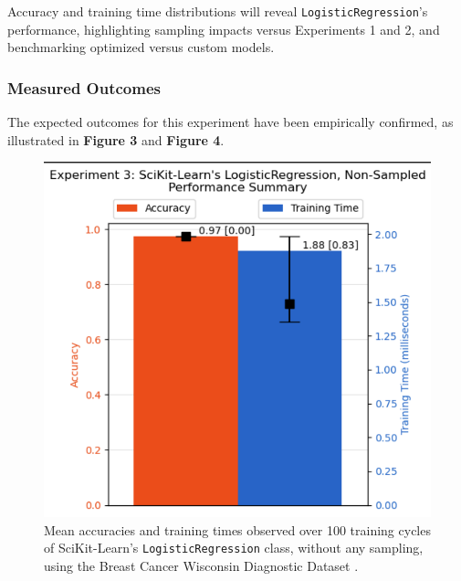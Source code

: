 \documentclass{article}
\theoremstyle{plain}
\theoremstyle{definition}
\theoremstyle{remark}
\begin{document}
Accuracy and training time distributions will reveal \texttt{LogisticRegression}'s performance, highlighting sampling impacts versus Experiments 1 and 2, and benchmarking optimized versus custom models.

\subsubsection{Measured Outcomes}

The expected outcomes for this experiment have been empirically confirmed, as illustrated in \textbf{Figure 3} and \textbf{Figure 4}.

\begin{figure}[ht]
	\vskip 0.2in
	\begin{center}
		\centerline{\includegraphics[width=\columnwidth]{experiment_03}}
		\caption{Mean accuracies and training times observed over 100 training cycles of SciKit-Learn's \texttt{LogisticRegression} class, without any sampling, using the Breast Cancer Wisconsin Diagnostic Dataset \cite{breastcancer}.}
		\label{experiment_03}
	\end{center}
	\vskip -0.2in
\end{figure}
\end{document}
